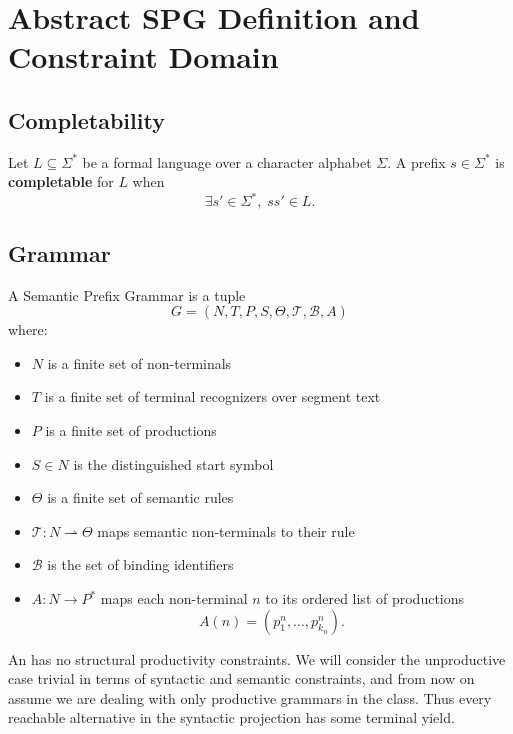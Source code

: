 \section{Abstract SPG Definition and Constraint Domain}
\label{sec:semantic-prefix-grammars}

\subsection{Completability}

Let $L \subseteq \Sigma^*$ be a formal language over a character alphabet $\Sigma$.
A prefix $s \in \Sigma^*$ is \textbf{completable} for $L$ when
\[
	\exists s' \in \Sigma^*, \; ss' \in L.
\]

\subsection{Grammar}
\label{sec:gram-def}

A Semantic Prefix Grammar is a tuple
\[
G = (N, T, P, S, \Theta, \mathcal{T}, \mathcal B, A)
\]
where:
\begin{itemize}[nosep]
    \item \(N\) is a finite set of non-terminals
    \item \(T\) is a finite set of terminal recognizers over segment text
    \item \(P\) is a finite set of productions
    \item \(S \in N\) is the distinguished start symbol
    \item \(\Theta\) is a finite set of semantic rules
    \item \(\mathcal{T} : N \rightharpoonup \Theta\) maps semantic non-terminals to their rule
    \item $\mathcal B$ is the set of binding identifiers
    \item \(A : N \to P^*\) maps each non-terminal \(n\) to its ordered list of productions
    \[
    A(n) = (p_1^n, \dots, p_{k_n}^n).
    \]
\end{itemize}

\begin{assumption}
\label{ass:spg-productivity}
    An \spg has no structural productivity constraints. We will consider the unproductive case trivial in terms of syntactic and semantic constraints, and from now on assume we are dealing with only productive grammars in the \spg class. Thus every reachable alternative in
    the syntactic projection has some terminal yield.
\end{assumption}

